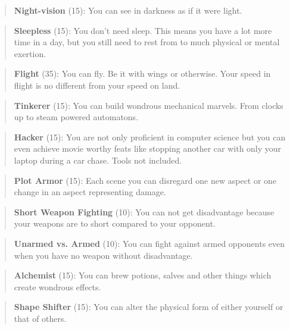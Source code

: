\documentclass[11pt]{article}
\begin{document}
{\begin{quote}
\textbf{Night-vision} (15): You can see in darkness as if it were light.
\end{quote}

\begin{quote}
\textbf{Sleepless} (15): You don't need sleep. This means you have a lot more time in a day, but you still need to rest from to much physical or mental exertion.
\end{quote}

\begin{quote}
\textbf{Flight} (35): You can fly. Be it with wings or otherwise. Your speed in flight is no different from your speed on land.
\end{quote}

\begin{quote}
\textbf{Tinkerer} (15): You can build wondrous mechanical marvels. From clocks up to steam powered automatons. 
\end{quote}

\begin{quote}
\textbf{Hacker} (15): You are not only proficient in computer science but you can even achieve movie worthy feats like stopping another car with only your laptop during a car chase. Tools not included.
\end{quote}

\begin{quote}
\textbf{Plot Armor} (15): Each scene you can disregard one new aspect or one change in an aspect representing damage. 
\end{quote}

\begin{quote}
\textbf{Short Weapon Fighting} (10): You can not get disadvantage because your weapons are to short compared to your opponent.
\end{quote}

\begin{quote}
\textbf{Unarmed vs. Armed} (10): You can fight against armed opponents even when you have no weapon without disadvantage.
\end{quote}

\begin{quote}
\textbf{Alchemist} (15): You can brew potions, salves and other things which create wondrous effects.
\end{quote}

\begin{quote}
\textbf{Shape Shifter} (15): You can alter the physical form of either yourself or that of others.
\end{quote}

}
\end{document}
